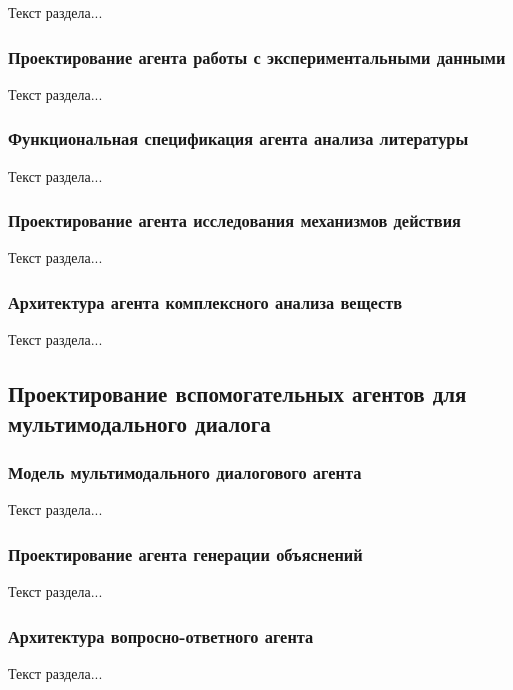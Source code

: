 Текст раздела...

\subsubsection{Проектирование агента работы с экспериментальными данными}

Текст раздела...

\subsubsection{Функциональная спецификация агента анализа литературы}

Текст раздела...

\subsubsection{Проектирование агента исследования механизмов действия}

Текст раздела...

\subsubsection{Архитектура агента комплексного анализа веществ}

Текст раздела...

\subsection{Проектирование вспомогательных агентов для мультимодального диалога}

\subsubsection{Модель мультимодального диалогового агента}

Текст раздела...

\subsubsection{Проектирование агента генерации объяснений}

Текст раздела...

\subsubsection{Архитектура вопросно-ответного агента}

Текст раздела...

